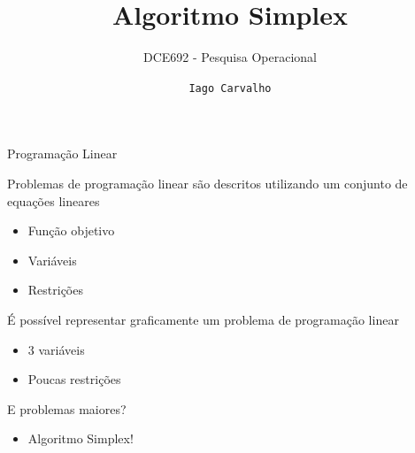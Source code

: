\documentclass[compress,mathserif]{beamer}
\title{Algoritmo Simplex}
\subtitle{DCE692 - Pesquisa Operacional}
\author{\texttt{Iago Carvalho}}
\institute{\texttt{Departamento de Ciência da Computação}}
\begin{document}
\begin{frame}
\titlepage

\end{frame}


\begin{frame}{Programação Linear}

Problemas de programação linear são descritos utilizando um conjunto de equações lineares
\begin{itemize}
    \item Função objetivo
    \item Variáveis
    \item Restrições
\end{itemize}

\vspace{0.5cm}

É possível representar graficamente um problema de programação linear
\begin{itemize}
    \item 3 variáveis
    \item Poucas restrições
\end{itemize}

\vspace{0.5cm}

E problemas maiores? 
\begin{itemize}
    \item Algoritmo Simplex!
\end{itemize}
\end{frame}

\end{document}
